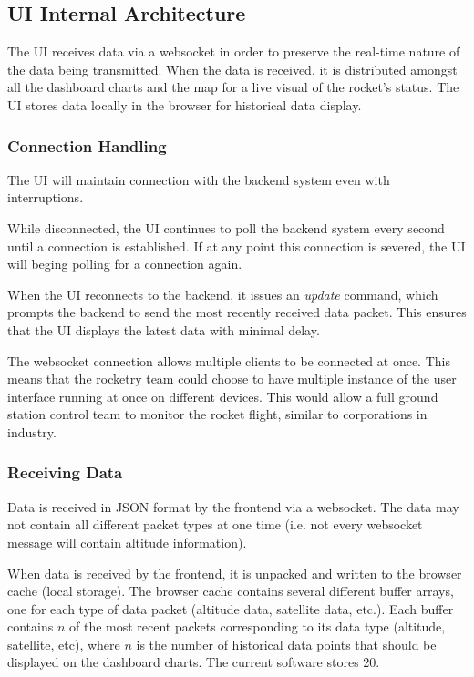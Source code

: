 \subsectionfont{\fontsize{14}{14}\selectfont}
\subsection{UI Internal Architecture}

The UI receives data via a websocket in order to preserve the real-time nature of the data being transmitted. When the data
is received, it is distributed amongst all the dashboard charts and the map for a live visual of the rocket's status. The UI 
stores data locally in the browser for historical data display.

\subsubsection{Connection Handling}
The UI will maintain connection with the backend system even with interruptions.

While disconnected, the UI continues to poll the backend system every second
until a connection is established. If at any point this connection is severed,
the UI will beging polling for a connection again.

When the UI reconnects to the backend, it issues an \emph{update} command, which prompts the backend to send the most recently
received data packet. This ensures that the UI displays the latest data with minimal delay.

The websocket connection allows multiple clients to be connected at once. This means
that the rocketry team could choose to have multiple instance of the user interface
running at once on different devices. This would allow a full ground station control team
to monitor the rocket flight, similar to corporations in industry.

\subsubsection{Receiving Data}

Data is received in JSON format by the frontend via a websocket. The data may not contain all different packet types
at one time (i.e. not every websocket message will contain altitude information).

When data is received by the frontend, it is unpacked and written to the browser cache (local storage). The browser cache
contains several different buffer arrays, one for each type of data packet (altitude data, satellite data, etc.). Each buffer
contains $n$ of the most recent packets corresponding to its data type (altitude, satellite, etc), where $n$ is the number of
historical data points that should be displayed on the dashboard charts. The current software stores 20.

